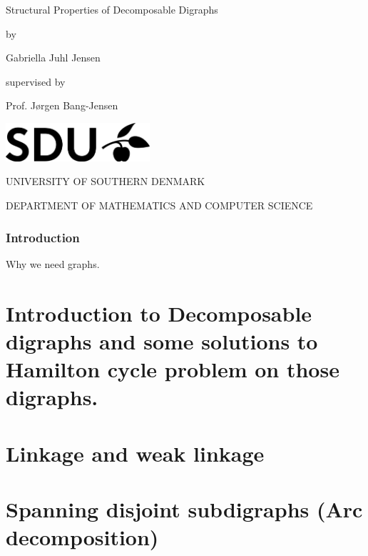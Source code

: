 \documentclass[11pt,oneside,a4paper]{report}
\begin{document}
\begin{titlepage}
	\begin{center}
		\vspace*{1cm}
		\huge{Structural Properties of Decomposable Digraphs}
		
		\vspace*{0.5cm}
		\large{by}
		
		\vspace{0.5cm}
		\Large{Gabriella Juhl Jensen}
		
		\vspace*{0.5cm}
		\normalsize{supervised by}
		
		\vspace{0.5cm}
		\large{Prof. Jørgen Bang-Jensen}
		
		\vfill
		
		\vspace*{0.7cm}
		\includegraphics[width=0.4\textwidth]{sdulogo}
		
		\vspace*{1cm}
		\MakeUppercase{University of southern Denmark}
		
		\vspace*{0.3cm}
		\MakeUppercase{Department of mathematics and computer science}
		
		\vspace*{0.3cm}
		\large{}
	\end{center}
\end{titlepage}
\tableofcontents
	\section{Introduction}
	Why we need graphs.
	\part{Introduction to Decomposable digraphs and some solutions to Hamilton cycle problem on those digraphs.}
	
	\clearpage
	\part{Linkage and weak linkage}
	\clearpage
	\part{Spanning disjoint subdigraphs (Arc decomposition)}
	\clearpage


\end{document}
